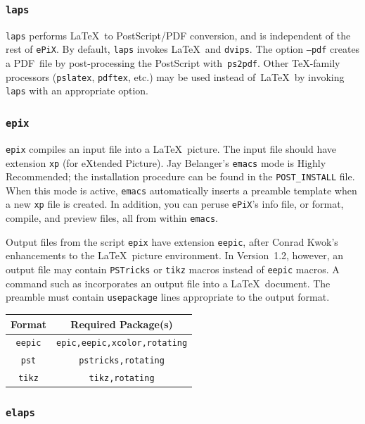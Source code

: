 \documentclass[12pt,letterpaper]{book}
\newcommand{\code}[1]{\texttt{#1}}
\newcommand{\filename}[1]{\texttt{#1}}
\newcommand{\ePiX}{\code{ePiX}}
\newcommand{\texicomment}{}
\newcommand{\texicommentend}{}
\begin{document}
\subsubsection*{\code{laps}}

\code{laps} performs \LaTeX\ to PostScript/PDF conversion, and is
independent of the rest of \ePiX. By default, \code{laps} invokes
\LaTeX~and \code{dvips}. The option \code{--pdf} creates a PDF~file by
post-processing the PostScript with~\code{ps2pdf}.  Other \TeX-family
processors (\code{pslatex}, \code{pdftex}, etc.) may be used instead
of~\LaTeX\ by invoking \code{laps} with an appropriate option.


\subsubsection*{\code{epix}}

\code{epix} compiles an input file into a \LaTeX\ picture.  The input
file should have extension \filename{xp} (for eXtended Picture).  Jay
Belanger's \code{emacs} mode is Highly Recommended; the installation
procedure can be found in the \filename{POST\_INSTALL} file. When this
mode is active, \code{emacs} automatically inserts a preamble template
when a new \filename{xp} file is created. In addition, you can peruse
\ePiX's info file, or format, compile, and preview files, all from
within \code{emacs}.
\index{Emacs@\code{emacs}}

Output files from the script \code{epix} have extension
\filename{eepic}, after Conrad Kwok's enhancements to the \LaTeX\
picture environment. In Version~1.2, however, an output file may
contain \code{PSTricks} or \code{tikz} macros instead of \code{eepic}
macros.  A command such as \verb++ incorporates an
output file into a \LaTeX\ document. The preamble must contain
\code{usepackage} lines appropriate to the output format.
\texicomment
\begin{center}
  \begin{tabular}{cc}
    Format & Required Package(s) \\
    \hline
    \code{eepic} & \code{epic,eepic,xcolor,rotating} \\
    \code{pst}   & \code{pstricks,rotating} \\
    \code{tikz}  & \code{tikz,rotating}
  \end{tabular}
\end{center}
\texicommentend


\subsubsection*{\code{elaps}}
\end{document}
